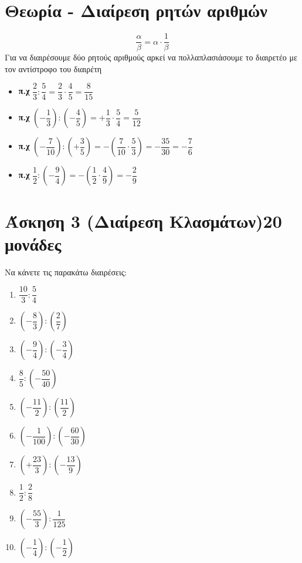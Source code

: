\documentclass[a4paper,10pt]{report}
\begin{document}
\section*{Θεωρία - Διαίρεση ρητών αριθμών \hfill \small{}}
 $$ \frac{α}{β}=α\cdot \frac{1}{β} $$
 Για να διαιρέσουμε δύο ρητούς αριθμούς αρκεί να πολλαπλασιάσουμε το διαιρετέο με τον αντίστροφο του διαιρέτη 
\begin{itemize}
  \item      \textbf{π.χ} $\dfrac{2}{3}:\dfrac{5}{4}=\dfrac{2}{3}\cdot \dfrac{4}{5}=\dfrac{8}{15}$
  \item      \textbf{π.χ} $(-\dfrac{1}{3}):(-\dfrac{4}{5})=+\dfrac{1}{3}\cdot \dfrac{5}{4}=\dfrac{5}{12}$ 
  \item      \textbf{π.χ} $(-\dfrac{7}{10}):(+\dfrac{3}{5})=-(\dfrac{7}{10}\cdot \dfrac{5}{3})=-\dfrac{35}{30}=-\dfrac{7}{6}$ 
  \item      \textbf{π.χ} $\dfrac{1}{2}:(-\dfrac{9}{4})=-(\dfrac{1}{2}\cdot \dfrac{4}{9})=-\dfrac{2}{9}$  
\end{itemize}
\newpage
\section*{Άσκηση 3  (Διαίρεση Κλασμάτων)\hfill \small{20 μονάδες}}
Να κάνετε τις παρακάτω διαιρέσεις:
\begin{multicols}{2}
\begin{enumerate}[1)]
 \item $\dfrac{10}{3}:\dfrac{5}{4}$
 \item $(-\dfrac{8}{3}):(\dfrac{2}{7})$
 \item $(-\dfrac{9}{4}):(-\dfrac{3}{4})$
 \item $\dfrac{8}{5}:(-\dfrac{50}{40})$
 \item $(-\dfrac{11}{2}):(\dfrac{11}{2})$
 \item $(-\dfrac{1}{100}):(-\dfrac{60}{30})$
 \item $(+\dfrac{23}{3}):(-\dfrac{13}{9})$
 \item $\dfrac{1}{2}:\dfrac{2}{8}$
 \item $(-\dfrac{55}{3}):\dfrac{1}{125}$
 \item $(-\dfrac{1}{4}):(-\dfrac{1}{2})$
\end{enumerate}
\end{multicols}
\end{document}
